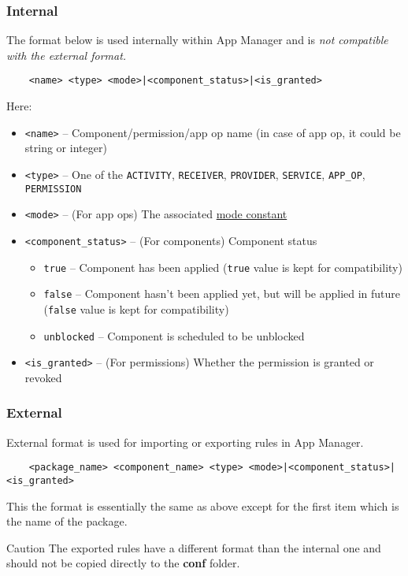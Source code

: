 \subsubsection{Internal} %
The format below is used internally within App Manager and is \textit{not compatible with the external format.}
\begin{Verbatim}
    <name> <type> <mode>|<component_status>|<is_granted>
\end{Verbatim}
Here:
\begin{itemize}
    \item \texttt{<name>} -- Component/permission/app op name (in case of app op, it could be string or integer)
    \item \texttt{<type>} -- One of the \texttt{ACTIVITY}, \texttt{RECEIVER}, \texttt{PROVIDER}, \texttt{SERVICE},
    \texttt{APP\_OP},  \texttt{PERMISSION}
    \item \texttt{<mode>} -- (For app ops) The associated \hyperref[subsec:mode-constants]{mode constant}
    \item \texttt{<component\_status>} -- (For components) Component status
    \begin{itemize}
        \item \texttt{true} -- Component has been applied (\texttt{true} value is kept for compatibility)
        \item \texttt{false} -- Component hasn't been applied yet, but will be applied in future (\texttt{false} value
        is kept for compatibility)
        \item \texttt{unblocked} -- Component is scheduled to be unblocked
    \end{itemize}
    \item \texttt{<is\_granted>} -- (For permissions) Whether the permission is granted or revoked
\end{itemize}

\subsubsection{External} %
External format is used for importing or exporting rules in App Manager.
\begin{Verbatim}
    <package_name> <component_name> <type> <mode>|<component_status>|<is_granted>
\end{Verbatim}
This the format is essentially the same as above except for the first item which is the name of the package.

\begin{danger}{Caution}
    The exported rules have a different format than the internal one and should not be copied directly to the
    \textbf{conf} folder.
\end{danger}
